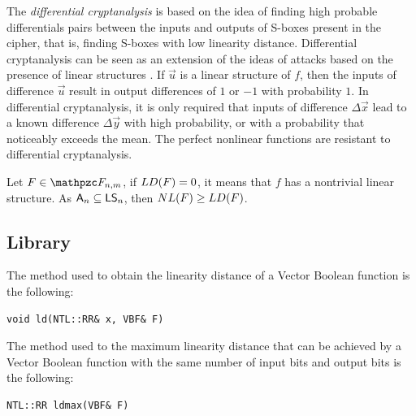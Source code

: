 The \textit{differential cryptanalysis} is based on the idea of finding high probable differentials pairs between 
the inputs and outputs of S-boxes present in the cipher, that is, finding S-boxes with low linearity distance. 
Differential cryptanalysis \cite{BihamS:90} can be seen as an extension of the ideas of attacks based on the presence 
of linear structures \cite{Nyberg:91}. If $\vec{u}$ is a linear structure of $f$, then the inputs of difference $\vec{u}$ result in output differences of $1$ or $-1$ with probability $1$. In differential cryptanalysis, 
it is only required that inputs of difference $\Delta\vec{x}$ lead to a known difference  $\Delta\vec{y}$ with high probability, 
or with a probability that noticeably exceeds the mean. The perfect nonlinear functions are resistant to differential cryptanalysis.

Let $F \in \funct{F}_{n,m}$, if $\crit{LD}(F) = 0$, it means that $f$ has a nontrivial linear structure. As $\set{A}_n \subseteq \set{LS}_n$, then $\crit{NL}(F) \geq \crit{LD}(F)$. 

\subsection{Library}

The method used to obtain the linearity distance of a Vector Boolean function is the following:

\begin{verbatim}
void ld(NTL::RR& x, VBF& F)
\end{verbatim}

The method used to the maximum linearity distance that can be achieved by a Vector Boolean function with the same number of input bits and output bits is the following:

\begin{verbatim}
NTL::RR ldmax(VBF& F)
\end{verbatim}

